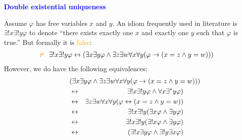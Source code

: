 \documentclass{slides}
\begin{document}
\begin{slide}

\begin{center}
\textcolor{blue}{\textbf{Double existential uniqueness}}
\end{center}

Assume $\varphi$ has free variables $x$ and $y$.
An idiom frequently used in literature is $\exists{!} x \exists{!} y
 \varphi$ to denote ``there exists exactly one $x$ and exactly one $y$
such that $\varphi$ is true.''  But formally it is
\textcolor{orange}{false}:
\begin{eqnarray} \textcolor{orange}{\nvdash} \ \ \exists{!}
x \exists{!} y \varphi
 \leftrightarrow ( \exists x \exists y \varphi
\wedge \exists z \exists w \forall x \forall y ( \varphi \rightarrow ( x
= z \wedge y = w ) ) )
\end{eqnarray}
However, we do have the following equivalences:
\begin{eqnarray}
     \lefteqn{( \exists x \exists y  \varphi  \wedge \exists z
\exists w \forall x \forall y ( \varphi  \rightarrow
( x = z \wedge y = w ) ) ) } \nonumber \\
       & \leftrightarrow &  \exists{!} x \exists{!} y \varphi
           \wedge \forall x \exists^\ast y
\varphi ) \label{2eu5} \\
       & \leftrightarrow &  \exists z \exists w \forall x \forall y ( \varphi
\leftrightarrow ( x = z \wedge y = w ) ) \label{2eu6} \\
       & \leftrightarrow & \exists{!} x \exists{!} y ( \exists x \varphi \wedge \exists
y \varphi ) \label{2eu7} \\
       & \leftrightarrow & \exists{!} x \exists{!} y ( \exists{!} x \varphi \wedge
\exists y \varphi ) \label{2eu8} \\
       & \leftrightarrow & ( \exists{!} x \exists y \varphi \wedge \exists{!} y \exists x \varphi
) \label{2eu4}
\end{eqnarray}



\end{slide}
\end{document}
